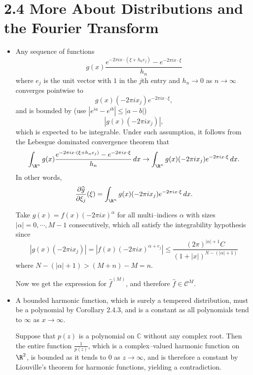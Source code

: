 
\section*{2.4 More About Distributions and the Fourier Transform}
\begin{itemize}
\item[2.4.1]

Any sequence of functions
$$g(x)\frac{e^{-2\pi ix\cdot(\xi+h_ne_j)}-e^{-2\pi ix\cdot\xi}}{h_n}$$
where $e_j$ is the unit vector with $1$ in the $j$th entry and
 $h_n\rightarrow0$ as $n\rightarrow\infty$ converges pointwise to
$$g(x)(-2\pi ix_j)e^{-2\pi ix\cdot\xi},$$
and is bounded by (use $|e^{ia}-e^{ib}|\le|a-b|$)
$$|g(x)(-2\pi ix_j)|,$$
which is expected to be integrable.
Under such assumption, it follows from the Lebesgue dominated convergence theorem that
$$\int_{\R^n} g(x)\frac{e^{-2\pi ix\cdot(\xi+h_ne_j)}-e^{-2\pi ix\cdot\xi}}{h_n}\,dx
\rightarrow\int_{\R^n} g(x)(-2\pi ix_j)e^{-2\pi ix\cdot\xi}\,dx.$$
In other words,
$$\frac{\partial\widehat{g}}{\partial \xi_j}(\xi)
=\int_{\R^n} g(x)(-2\pi ix_j)e^{-2\pi ix\cdot\xi}\,dx.$$

Take $g(x)=f(x)(-2\pi ix)^\alpha$ for all multi--indices $\alpha$ 
with sizes $|\alpha|=0,\cdots,M-1$ consecutively, 
which all satisfy the integrability hypothesis since
$$|g(x)(-2\pi ix_j)|=|f(x)(-2\pi ix)^{\alpha+e_j}|
\leq\frac{(2\pi)^{|\alpha|+1}C}{(1+|x|)^{N-(|\alpha|+1)}}$$
where $N-(|\alpha|+1)>(M+n)-M=n$.

Now we get the expression for $\widehat{f}^{(M)}$, 
and therefore $\widehat{f}\in\mathscr{C}^M$.

\item[2.4.2]

A bounded harmonic function, which is surely a tempered distribution, 
must be a polynomial by Corollary 2.4.3, 
and is a constant as all polynomials tend to $\infty$ as $x\rightarrow\infty$.

Suppose that $p(z)$ is a polynomial on $\mathbb{C}$ without any complex root. 
Then the entire function  $\frac{1}{p(z)}$, 
which is a complex--valued harmonic function on $\R^2$, 
is bounded as it tends to $0$ as $z\rightarrow\infty$, 
and is therefore a constant by Liouville's theorem for harmonic functions, 
yielding a contradiction.


\end{itemize}
